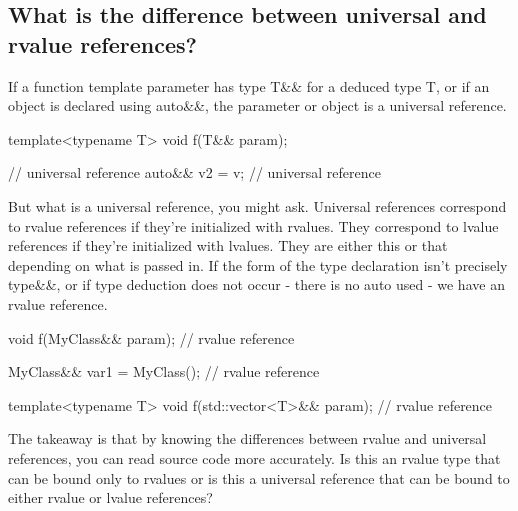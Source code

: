 \documentclass{report}
\begin{document}
 \bigbreak \noindent 
 \subsection{What is the difference between universal and rvalue references?}
 \bigbreak \noindent 
 If a function template parameter has type T\&\& for a deduced type T, or if an object is declared using auto\&\&, the parameter or object is a universal reference.
 \bigbreak \noindent 
 \begin{cppcode}
     template<typename T>
     void f(T&& param);

     // universal reference
     auto&& v2 = v; // universal reference
 \end{cppcode}
 \bigbreak \noindent 
 But what is a universal reference, you might ask. Universal references correspond to rvalue references if they’re initialized with rvalues. They correspond to lvalue references if they’re initialized with lvalues. They are either this or that depending on what is passed in.
 \bigbreak \noindent 
 If the form of the type declaration isn’t precisely type\&\&, or if type deduction does not occur - there is no auto used - we have an rvalue reference.
 \bigbreak \noindent 
 \begin{cppcode}
     void f(MyClass&& param); // rvalue reference

     MyClass&& var1 = MyClass(); // rvalue reference

     template<typename T>
     void f(std::vector<T>&& param); // rvalue reference
 \end{cppcode}
 \bigbreak \noindent 
 The takeaway is that by knowing the differences between rvalue
and universal references, you can read source code more accurately.
Is this an rvalue type that can be bound only to rvalues or is this
a universal reference that can be bound to either rvalue or lvalue
references?
\end{document}
